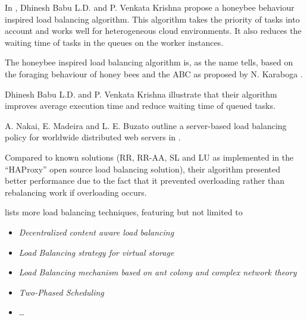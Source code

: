 In \cite{honeybee}, Dhinesh Babu L.D. and P. Venkata Krishna propose a honeybee
behaviour inspired load balancing algorithm.
This algorithm takes the priority of tasks into account and works well for
heterogeneous cloud environments.
It also reduces the waiting time of tasks in the queues on the worker instances.

The honeybee inspired load balancing algorithm is, as the name tells, based on
the foraging behaviour of honey bees and the \ac{ABC} as proposed by
N. Karaboga \cite{honeybee}.

Dhinesh Babu L.D. and P. Venkata Krishna illustrate that their algorithm
improves average execution time and reduce waiting time of queued tasks.

A. Nakai, E. Madeira and L. E. Buzato outline a server-based load balancing
policy for worldwide distributed web servers in \cite{nakai}.

Compared to known solutions (\ac{RR}, \ac{RR-AA}, \ac{SL} and \ac{LU} as
implemented in the ``HAProxy'' open source load balancing solution), their
algorithm presented better performance due to the fact that it
prevented overloading rather than rebalancing work if overloading occurs.

\cite{cloudLBTech} lists more load balancing techniques, featuring but not
limited to
\begin{itemize}
    \item \emph{Decentralized content aware load balancing}
    \item \emph{Load Balancing strategy for virtual storage}
    \item \emph{Load Balancing mechanism based on ant colony and complex network
        theory}
    \item \emph{Two-Phased Scheduling}
    \item \dots
\end{itemize}

